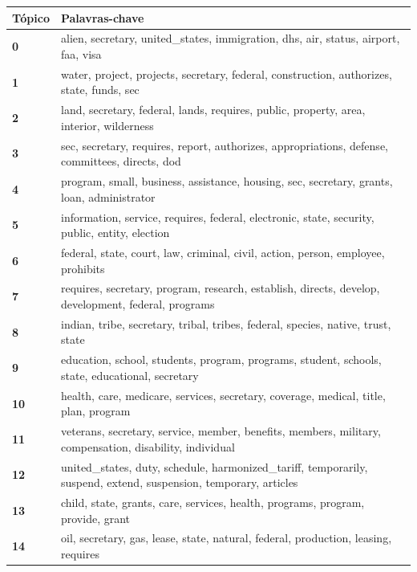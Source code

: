 \begin{table}[htpb]
    \centering
    \scriptsize
    \begin{tabularx}{\textwidth}{@{}l X@{}}
        \toprule
        \textbf{Tópico} & \textbf{Palavras-chave} \\
        \midrule
        \textbf{0} & alien, secretary, united\_states, immigration, dhs, air, status, airport, faa, visa \\
        \textbf{1} & water, project, projects, secretary, federal, construction, authorizes, state, funds, sec \\
        \textbf{2} & land, secretary, federal, lands, requires, public, property, area, interior, wilderness \\
        \textbf{3} & sec, secretary, requires, report, authorizes, appropriations, defense, committees, directs, dod \\
        \textbf{4} & program, small, business, assistance, housing, sec, secretary, grants, loan, administrator \\
        \textbf{5} & information, service, requires, federal, electronic, state, security, public, entity, election \\
        \textbf{6} & federal, state, court, law, criminal, civil, action, person, employee, prohibits \\
        \textbf{7} & requires, secretary, program, research, establish, directs, develop, development, federal, programs \\
        \textbf{8} & indian, tribe, secretary, tribal, tribes, federal, species, native, trust, state \\
        \textbf{9} & education, school, students, program, programs, student, schools, state, educational, secretary \\
        \textbf{10} & health, care, medicare, services, secretary, coverage, medical, title, plan, program \\
        \textbf{11} & veterans, secretary, service, member, benefits, members, military, compensation, disability, individual \\
        \textbf{12} & united\_states, duty, schedule, harmonized\_tariff, temporarily, suspend, extend, suspension, temporary, articles \\
        \textbf{13} & child, state, grants, care, services, health, programs, program, provide, grant \\
        \textbf{14} & oil, secretary, gas, lease, state, natural, federal, production, leasing, requires \\

\end{tabularx}
\end{table}
